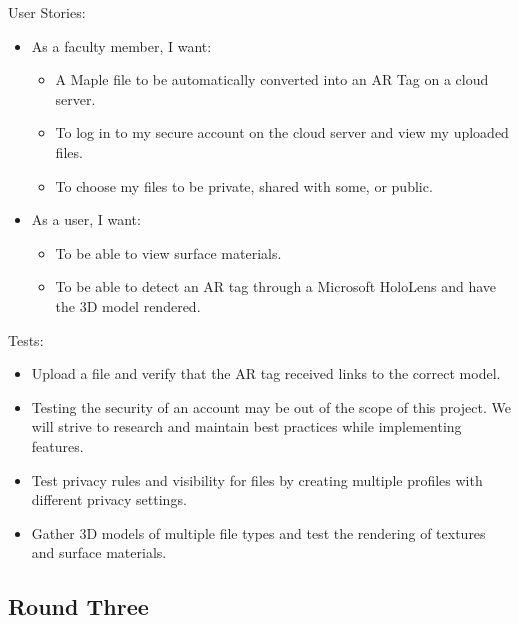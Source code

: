 User Stories:
\begin{itemize}
	\item As a faculty member, I want:
	\begin{itemize}
		\item A Maple file to be automatically converted into an AR Tag on a 
		cloud server.
		\item To log in to my secure account on the cloud server and view my 
		uploaded files.
		\item To choose my files to be private, shared with some, or public.
	\end{itemize}
	\item As a user, I want:
	\begin{itemize}
		\item To be able to view surface materials.
		\item To be able to detect an AR tag through a Microsoft HoloLens and 
		have the 3D model rendered.
	\end{itemize}
\end{itemize}
Tests:
\begin{itemize}
	\item Upload a file and verify that the AR tag received links to the correct
	model.
	\item Testing the security of an account may be out of the scope of this 
	project. We will strive to research and maintain best practices while 
	implementing features.
	\item Test privacy rules and visibility for files by creating multiple 
	profiles with different privacy settings.
	\item Gather 3D models of multiple file types and test the rendering of 
	textures and surface materials.
\end{itemize}

\subsection{Round Three}

